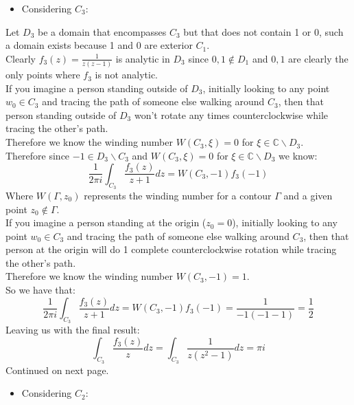 \documentclass{article}
\begin{document}
\begin{itemize}
    \item Considering $C_3$:
\end{itemize}
\begin{center}
    \doublespacing
    Let $D_3$ be a domain that encompasses $C_3$ but that does not contain 1 or 0, such a domain exists because 1 and 0 are exterior $C_1$.
    \\Clearly $f_3 (z) =\frac{1}{z(z - 1)}$ is analytic in $D_3$ since $0, 1\notin D_1$ and $0, 1$ are clearly the only points where $f_3$ is not analytic.
    \\If you imagine a person standing outside of $D_3$, initially looking to any point $w_0\in C_3$ and tracing the path of someone else walking around $C_3$, then that person standing outside of $D_3$ won't rotate any times counterclockwise while tracing the other's path.
    \\Therefore we know the winding number $W(C_3,\xi) = 0$ for $\xi\in\mathbb{C}\backslash D_3$.
    \\Therefore since $-1\in D_3\backslash C_3$ and $W(C_3,\xi) = 0$ for $\xi\in\mathbb{C}\backslash D_3$ we know:
    \[\frac{1}{2\pi i}\int _{C_3}\frac{f_3(z)}{z+1} dz = W(C_3, -1) f_3(-1)\]
    Where $W(\Gamma, z_0)$ represents the winding number for a contour $\Gamma$ and a given point $z_0\notin\Gamma$.
    \\If you imagine a person standing at the origin ($z_0 = 0$), initially looking to any point $w_0\in C_3$ and tracing the path of someone else walking around $C_3$, then that person at the origin will do 1 complete counterclockwise rotation while tracing the other's path.
    \\Therefore we know the winding number $W(C_3, -1) = 1$.
    \\So we have that:
    \[\frac{1}{2\pi i}\int _{C_3}\frac{f_3(z)}{z+1} dz = W(C_3, -1) f_3(-1) =\frac{1}{-1(-1 - 1)} =\frac{1}{2}\]
    Leaving us with the final result:
    \[\int _{C_3}\frac{f_3(z)}{z} dz =\int _{C_3}\frac{1}{z(z^2-1)} dz =\pi i\]
    \break
    Continued on next page.
    \newpage
\end{center}
\begin{itemize}
    \item Considering $C_2$:
\end{itemize}
\end{document}

